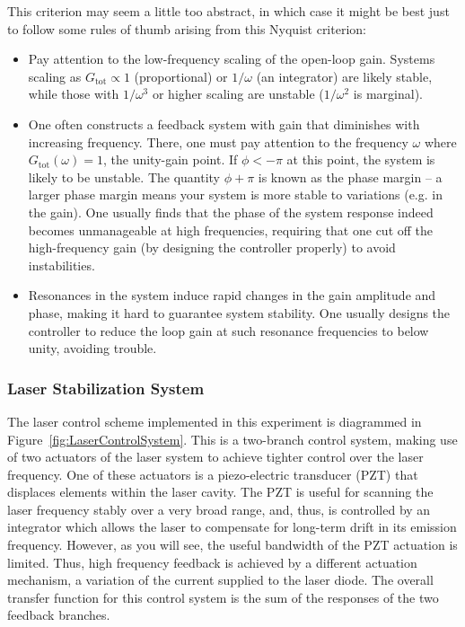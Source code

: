 \documentclass{../lab}
\begin{document}
This criterion may seem a little too abstract, in which case it might be best just to follow some rules of thumb arising from this Nyquist criterion:

\begin{itemize}
    \item Pay attention to the low-frequency scaling of the open-loop gain. Systems scaling as $G_\text{tot}\propto 1$ (proportional) or $1/\omega$ (an integrator) are likely stable, while those with $1/\omega^3$ or higher scaling are unstable ($1/\omega^2$ is marginal).

    \item One often constructs a feedback system with gain that diminishes with increasing frequency. There, one must pay attention to the frequency $\omega$ where $ G_\text{tot}(\omega) = 1$, the unity-gain point. If $\phi < -\pi$ at this point, the system is likely to be unstable. The quantity $\phi + \pi$ is known as the phase margin – a larger phase margin means your system is more stable to variations (e.g. in the gain). One usually finds that the phase of the system response indeed becomes unmanageable at high frequencies, requiring that one cut off the high-frequency gain (by designing the controller properly) to avoid instabilities.

    \item Resonances in the system induce rapid changes in the gain amplitude and phase, making it hard to guarantee system stability. One usually designs the controller to reduce the loop gain at such resonance frequencies to below unity, avoiding trouble.
\end{itemize}

\subsubsection{Laser Stabilization System}

The laser control scheme implemented in this experiment is diagrammed in Figure~\ref{fig:LaserControlSystem}. This is a two-branch control system, making use of two actuators of the laser system to achieve tighter control over the laser frequency. One of these actuators is a piezo-electric transducer (PZT) that displaces elements within the laser cavity. The PZT is useful for scanning the laser frequency stably over a very broad range, and, thus, is controlled by an integrator which allows the laser to compensate for long-term drift in its emission frequency. However, as you will see, the useful bandwidth of the PZT actuation is limited. Thus, high frequency feedback is achieved by a different actuation mechanism, a variation of the current supplied to the laser diode. The overall transfer function for this control system is the sum of the responses of the two feedback branches.
\end{document}
